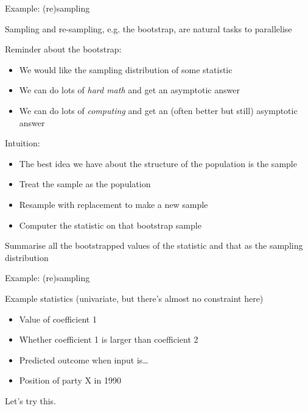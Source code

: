 \documentclass{hertieteaching}
\begin{document}
\begin{frame}{Example: (re)sampling}

Sampling and re-sampling, e.g. the bootstrap, are natural tasks to parallelise

Reminder about the bootstrap:
\begin{itemize}
  \item We would like the sampling distribution of some statistic
  \item We can do lots of \textit{hard math} and get an asymptotic answer
  \item We can do lots of \textit{computing} and get an (often better but still) asymptotic answer
\end{itemize}

Intuition:
\begin{itemize}
  \item The best idea we have about the structure of the population is the sample
  \item Treat the sample as the population
  \item Resample with replacement to make a new sample
  \item Computer the statistic on that bootstrap sample
\end{itemize}
Summarise all the bootstrapped values of the statistic and that as the sampling distribution

\end{frame}

\begin{frame}{Example: (re)sampling}

Example statistics (univariate, but there's almost no constraint here)
\begin{itemize}
  \item Value of coefficient 1
  \item Whether coefficient 1 is larger than coefficient 2
  \item Predicted outcome when input is\ldots
  \item Position of party X in 1990
\end{itemize}

Let's try this.

\end{frame}
\end{document}
